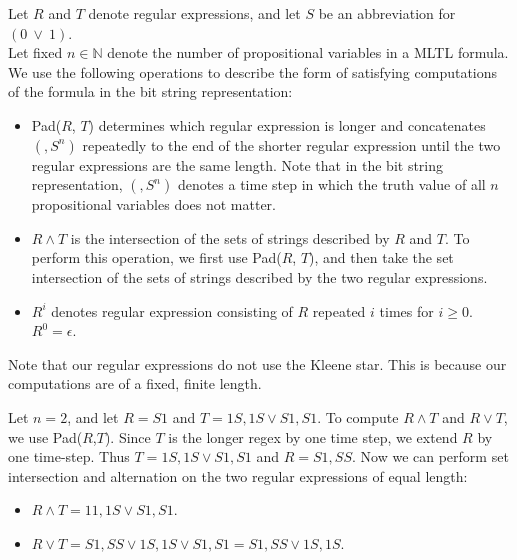 \documentclass[runningheads]{llncs}
\begin{document}
\begin{definition} \label{TRE} 
Let $R$ and $T$ denote regular expressions, and let $S$ be an abbreviation for $(0 \ \lor \ 1)$.\\
Let fixed $n \in \mathbb{N}$ denote the number of propositional variables in a MLTL formula. We use the following operations to describe the form of satisfying computations of the formula in the bit string representation:
\begin{itemize}
\item Pad($R$, $T$) determines which regular expression is longer and concatenates $(,S^n)$ repeatedly to the end of the shorter regular expression until the two regular expressions are the same length. Note that in the bit string representation, $(,S^n)$ denotes a time step in which the truth value of all $n$ propositional variables does not matter.
\item $R \land T$ is the intersection of the sets of strings described by $R$ and $T$. To perform this operation, we first use Pad($R$, $T$), and then take the set intersection of the sets of strings described by the two regular expressions.
\item $R^i$ denotes regular expression consisting of $R$ repeated $i$ times for $i \geq 0$. $R^0 = \epsilon$. %
\end{itemize}
\end{definition}
Note that our regular expressions do not use the Kleene star. This is because our computations are of a fixed, finite length.
\begin{example} %
Let $n = 2$, and let $R = S1$ and $T = 1S,1S \lor S1,S1$.
To compute $R \land T$ and $R \lor T$, we use Pad($R$,$T$). Since $T$ is the longer regex by one time step, we extend $R$ by one time-step. Thus $T =1S,1S \lor S1,S1$ and $R = S1,SS$. Now we can perform set intersection and alternation on the two regular expressions of equal length:
\begin{itemize}
    \item $R \land T = 11,1S \lor S1, S1$.
    \item $R \lor T = S1,SS \lor 1S,1S \lor S1,S1 = S1,SS \lor 1S,1S$.
\end{itemize}
\end{example}
\end{document}
